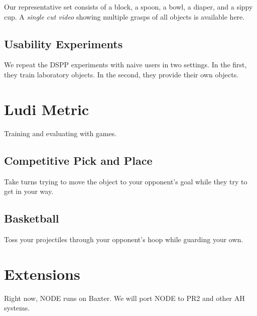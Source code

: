 \documentclass[conference]{IEEEtran}
\begin{document}
Our representative set consists of a block, a spoon,
a bowl, a diaper, and a sippy cup. A \emph{single cut video} showing multiple grasps
of all objects is available here.

\subsection{Usability Experiments}
We repeat the DSPP experiments with naive users in two settings. In the first, they train laboratory
objects. In the second, they provide their own objects.

\section{Ludi Metric}
Training and evaluating with games.

\subsection{Competitive Pick and Place}
Take turns trying to move the object to your opponent's goal while they try to get in your way.

\subsection{Basketball}
Toss your projectiles through your opponent's hoop while guarding your own.


\citep{tellex11}


\section{Extensions}
Right now, NODE runs on Baxter. We will port NODE to PR2 and other AH systems.





\end{document}
